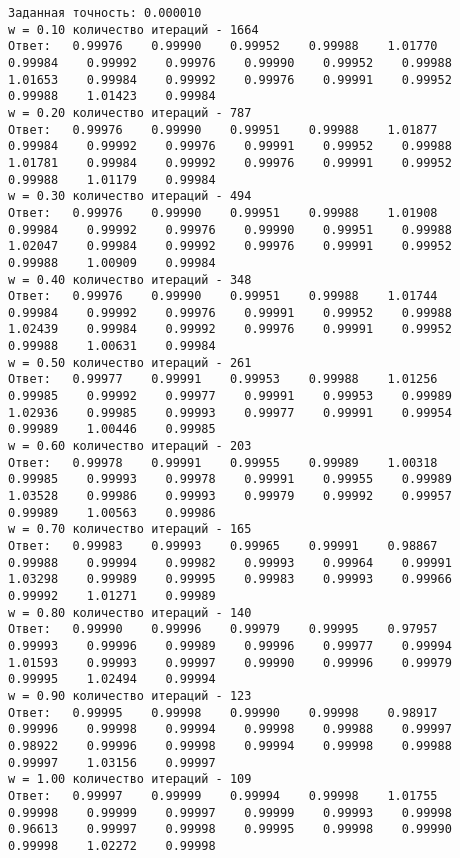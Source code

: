\documentclass[a4paper,12pt,titlepage,finall]{article}
\begin{document}
\begin{verbatim}
Заданная точность: 0.000010
w = 0.10 количество итераций - 1664
Ответ:   0.99976    0.99990    0.99952    0.99988    1.01770    0.99984    0.99992    0.99976    0.99990    0.99952    0.99988    1.01653    0.99984    0.99992    0.99976    0.99991    0.99952    0.99988    1.01423    0.99984 
w = 0.20 количество итераций - 787
Ответ:   0.99976    0.99990    0.99951    0.99988    1.01877    0.99984    0.99992    0.99976    0.99991    0.99952    0.99988    1.01781    0.99984    0.99992    0.99976    0.99991    0.99952    0.99988    1.01179    0.99984 
w = 0.30 количество итераций - 494
Ответ:   0.99976    0.99990    0.99951    0.99988    1.01908    0.99984    0.99992    0.99976    0.99990    0.99951    0.99988    1.02047    0.99984    0.99992    0.99976    0.99991    0.99952    0.99988    1.00909    0.99984 
w = 0.40 количество итераций - 348
Ответ:   0.99976    0.99990    0.99951    0.99988    1.01744    0.99984    0.99992    0.99976    0.99991    0.99952    0.99988    1.02439    0.99984    0.99992    0.99976    0.99991    0.99952    0.99988    1.00631    0.99984 
w = 0.50 количество итераций - 261
Ответ:   0.99977    0.99991    0.99953    0.99988    1.01256    0.99985    0.99992    0.99977    0.99991    0.99953    0.99989    1.02936    0.99985    0.99993    0.99977    0.99991    0.99954    0.99989    1.00446    0.99985 
w = 0.60 количество итераций - 203
Ответ:   0.99978    0.99991    0.99955    0.99989    1.00318    0.99985    0.99993    0.99978    0.99991    0.99955    0.99989    1.03528    0.99986    0.99993    0.99979    0.99992    0.99957    0.99989    1.00563    0.99986 
w = 0.70 количество итераций - 165
Ответ:   0.99983    0.99993    0.99965    0.99991    0.98867    0.99988    0.99994    0.99982    0.99993    0.99964    0.99991    1.03298    0.99989    0.99995    0.99983    0.99993    0.99966    0.99992    1.01271    0.99989 
w = 0.80 количество итераций - 140
Ответ:   0.99990    0.99996    0.99979    0.99995    0.97957    0.99993    0.99996    0.99989    0.99996    0.99977    0.99994    1.01593    0.99993    0.99997    0.99990    0.99996    0.99979    0.99995    1.02494    0.99994 
w = 0.90 количество итераций - 123
Ответ:   0.99995    0.99998    0.99990    0.99998    0.98917    0.99996    0.99998    0.99994    0.99998    0.99988    0.99997    0.98922    0.99996    0.99998    0.99994    0.99998    0.99988    0.99997    1.03156    0.99997 
w = 1.00 количество итераций - 109
Ответ:   0.99997    0.99999    0.99994    0.99998    1.01755    0.99998    0.99999    0.99997    0.99999    0.99993    0.99998    0.96613    0.99997    0.99998    0.99995    0.99998    0.99990    0.99998    1.02272    0.99998 

\end{verbatim}
\end{document}
